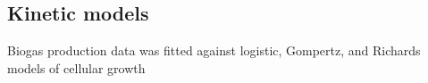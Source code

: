 \subsection{Kinetic models}
Biogas production data was fitted against logistic, Gompertz, and
Richards models of cellular growth 